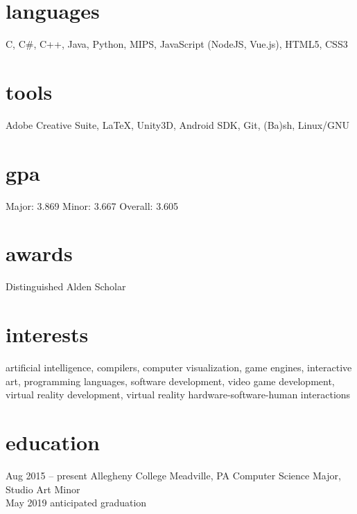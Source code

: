 \documentclass[]{friggeri-cv}
\begin{document}
\begin{aside}
  \section{languages}\vspace{0.05cm}
    C, C\#, C++, Java, Python, MIPS, JavaScript (NodeJS, Vue.js), HTML5, CSS3\vspace{0.1cm}
  \section{tools}\vspace{0.05cm}
    Adobe Creative Suite, \LaTeX , Unity3D, Android SDK, Git, (Ba)sh, Linux/GNU
  \section{gpa}\vspace{0.1cm}
  	Major: 3.869
  	Minor: 3.667
    Overall: 3.605\vspace{0.1cm}
  \section{awards}\vspace{0.05cm}
    Distinguished Alden Scholar\vspace{0.1cm}
\end{aside}

\section{interests}

artificial intelligence, compilers, computer visualization, game engines, interactive art, programming languages, software development, video game development, virtual reality development, virtual reality hardware-software-human interactions

\section{education}
\begin{entrylist}
  \entry
    {Aug 2015 -- present}
    {Allegheny College}
    {Meadville, PA}
    {Computer Science Major, Studio Art Minor\\May 2019 anticipated graduation}
\end{entrylist}
\end{document}
